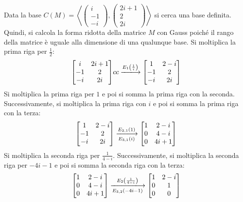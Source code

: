 \documentclass[a4paper]{article}
\makeatletter
\newenvironment{rowequmatbra}[1]{\left[\array{@{}#1@{}}}{\endarray\right]}
\makeatother
\begin{document}
	\noindent
	Data la base $C\left(M\right) = \left\langle \begin{pmatrix}
		i \\
		-1 \\
		-i
	\end{pmatrix}, \begin{pmatrix}
		2i+1 \\
		2 \\
		2i
	\end{pmatrix} \right\rangle$ si cerca una base definita. Quindi, si calcola la forma ridotta della matrice $M$ con Gauss poiché il rango della matrice è uguale alla dimensione di una qualunque base. Si moltiplica la prima riga per $\frac{1}{2}$:
	\begin{equation*}
		\begin{rowequmatbra}{cc}
			i & 2i+1 	\\
			-1 & 2		\\
			-i & 2i
		\end{rowequmatbra}{cc}
		\xlongrightarrow{E_{1}\left(\frac{1}{i}\right)}
		\begin{rowequmatbra}{cc}
			1 & 2-i 	\\
			-1 & 2		\\
			-i & 2i
		\end{rowequmatbra}
	\end{equation*}
	Si moltiplica la prima riga per $1$ e poi si somma la prima riga con la seconda. Successivamente, si moltiplica la prima riga con $i$ e poi si somma la prima riga con la terza:
	\begin{equation*}
		\begin{rowequmatbra}{cc}
			1 & 2-i 	\\
			-1 & 2		\\
			-i & 2i
		\end{rowequmatbra}
		\xlongrightarrow[E_{3,1}\left(i\right)]{E_{2,1}\left(1\right)}
		\begin{rowequmatbra}{cc}
			1 & 2-i 	\\
			0 & 4-i		\\
			0 & 4i+1
		\end{rowequmatbra}
	\end{equation*}
	Si moltiplica la seconda riga per $\frac{1}{4-i}$. Successivamente, si moltiplica la seconda riga per $-4i-1$ e poi si somma la seconda riga con la terza:
	\begin{equation*}
		\begin{rowequmatbra}{cc}
			1 & 2-i 	\\
			0 & 4-i		\\
			0 & 4i+1
		\end{rowequmatbra}
		\xlongrightarrow[E_{3,2}\left(-4i-1\right)]{E_{2}\left(\frac{1}{4-i}\right)}
		\begin{rowequmatbra}{cc}
			1 & 2-i 	\\
			0 & 1		\\
			0 & 0
		\end{rowequmatbra}
	\end{equation*}\newpage
\end{document}
